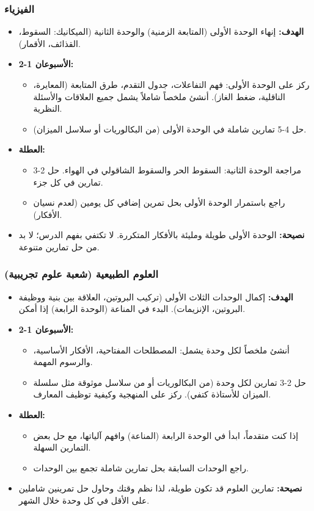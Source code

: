 \documentclass[12pt,a4paper]{book}
\begin{document}
\subsubsection*{الفيزياء}
\begin{itemize}
	\item \textbf{الهدف:} إنهاء الوحدة الأولى (المتابعة الزمنية) والوحدة الثانية (الميكانيك: السقوط، القذائف، الأقمار).
	\item \textbf{الأسبوعان 1-2:} 
	\begin{itemize}
		\item ركز على الوحدة الأولى: فهم التفاعلات، جدول التقدم، طرق المتابعة (المعايرة، الناقلية، ضغط الغاز). أنشئ ملخصاً شاملاً يشمل جميع العلاقات والأسئلة النظرية.
		\item حل 4-5 تمارين شاملة في الوحدة الأولى (من البكالوريات أو سلاسل الميزان).
	\end{itemize}
	\item \textbf{العطلة:} 
	\begin{itemize}
		\item  مراجعة الوحدة الثانية: السقوط الحر والسقوط الشاقولي في الهواء. حل 2-3 تمارين في كل جزء.
		\item راجع باستمرار الوحدة الأولى بحل تمرين إضافي كل يومين (لعدم نسيان الأفكار).
	\end{itemize}
	\item \textbf{نصيحة:} الوحدة الأولى طويلة ومليئة بالأفكار المتكررة. لا تكتفي بفهم الدرس؛ لا بد من حل تمارين متنوعة.
\end{itemize}

\subsubsection*{العلوم الطبيعية (شعبة علوم تجريبية)}
\begin{itemize}
	\item \textbf{الهدف:} إكمال الوحدات الثلاث الأولى (تركيب البروتين، العلاقة بين بنية ووظيفة البروتين، الإنزيمات). البدء في المناعة (الوحدة الرابعة) إذا أمكن.
	\item \textbf{الأسبوعان 1-2:}
	\begin{itemize}
		\item أنشئ ملخصاً لكل وحدة يشمل: المصطلحات المفتاحية، الأفكار الأساسية، والرسوم المهمة.
		\item حل 2-3 تمارين لكل وحدة (من البكالوريات أو من سلاسل موثوقة مثل سلسلة الميزان للأستاذة كتفي). ركز على المنهجية وكيفية توظيف المعارف.
	\end{itemize}
	\item \textbf{العطلة:}
	\begin{itemize}
		\item إذا كنت متقدماً، ابدأ في الوحدة الرابعة (المناعة) وافهم آلياتها، مع حل بعض التمارين السهلة.
		\item راجع الوحدات السابقة بحل تمارين شاملة تجمع بين الوحدات.
	\end{itemize}
	\item \textbf{نصيحة:} تمارين العلوم قد تكون طويلة، لذا نظم وقتك وحاول حل تمرينين شاملين على الأقل في كل وحدة خلال الشهر.
\end{itemize}
\end{document}
